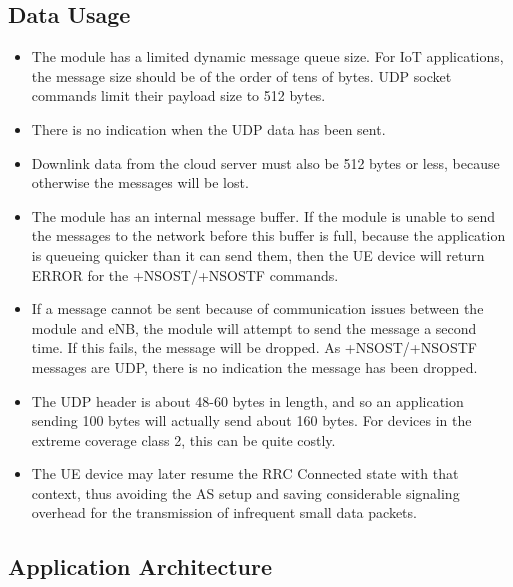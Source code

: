 \documentclass[]{article}
\providecommand{\tightlist}{%
  \setlength{\itemsep}{0pt}\setlength{\parskip}{0pt}}
\begin{document}
\hypertarget{data-usage}{%
\subsection{Data Usage}\label{data-usage}}

\begin{itemize}
\tightlist
\item
  The module has a limited dynamic message queue size. For IoT
  applications, the message size should be of the order of tens of
  bytes. UDP socket commands limit their payload size to 512 bytes.
\item
  There is no indication when the UDP data has been sent.
\item
  Downlink data from the cloud server must also be 512 bytes or less,
  because otherwise the messages will be lost.
\item
  The module has an internal message buffer. If the module is unable to
  send the messages to the network before this buffer is full, because
  the application is queueing quicker than it can send them, then the UE
  device will return ERROR for the +NSOST/+NSOSTF commands.
\item
  If a message cannot be sent because of communication issues between
  the module and eNB, the module will attempt to send the message a
  second time. If this fails, the message will be dropped. As
  +NSOST/+NSOSTF messages are UDP, there is no indication the message
  has been dropped.
\item
  The UDP header is about 48-60 bytes in length, and so an application
  sending 100 bytes will actually send about 160 bytes. For devices in
  the extreme coverage class 2, this can be quite costly.
\item
  The UE device may later resume the RRC Connected state with that
  context, thus avoiding the AS setup and saving considerable signaling
  overhead for the transmission of infrequent small data packets.
\end{itemize}

\hypertarget{application-architecture}{%
\subsection{Application Architecture}\label{application-architecture}}
\end{document}
